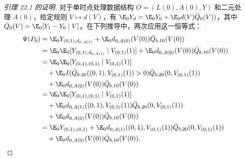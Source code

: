 \begin{proof}[引理 22.1 的证明]
对于单时点处理数据结构 $O=(L(0),A(0),Y)$ 和二元处理 $A(0)$，给定规则 $V\mapsto d(V)$，有 $\E_0Y_d=\E_0Y_0+\E_0d(V)\bar Q_0(V))$，其中 $\bar Q_0(V)=\E_0[Y_1-Y_0\mid V]$。在下列推导中，两次应用这一恒等式：
\[
\begin{aligned}
 \Psi(P_0)
 &=\E_0Y_{(0,1),d_{0,A(1)}}
 +\E_0d_{0,A(0)}(V(0))\bar Q_{b,10}(V(0))\\
 &=\E_0\E_0[Y_{(0,1),d_{0,A(1)}}\mid V_{(0,1)}(1)]
 +\E_0d_{0,A(0)}(V(0))\bar Q_{b,10}(V(0))\\
 &=\E_0\E_0[Y_{(0,1),(0,1)}\mid V_{(0,1)}(1)]\\
 &\quad+\E_0I(\bar Q_{b,20}((0,1),V_{(0,1)}(1))>0)
 \bar Q_{b,20}(0,V_{(0,1)}(1))\\
 &\quad+\E_0d_{0,A(0)}(V(0))\bar Q_{b,10}(V(0))\\
 &=\E_0\E_0[Y_{(0,1),(0,1)}\mid V_{(0,1)}(1)]\\
 &\quad+\E_0d_{0,A(1)}((0,1),V_{(0,1)}(1))
 \bar Q_{b,20}(0,V_{(0,1)}(1))\\
 &\quad+\E_0d_{0,A(0)}(V(0))\bar Q_{b,10}(V(0))\\
 &=\E_0Y_{(0,1),(0,1)}
 +\E_0d_{0,A(1)}((0,1),V_{(0,1)}(1))\bar Q_{b,20}(0,V_{(0,1)}(1))\\
 &\quad+\E_0d_{0,A(0)}(V(0))\bar Q_{b,10}(V(0)).
\end{aligned}
\]
\end{proof}

